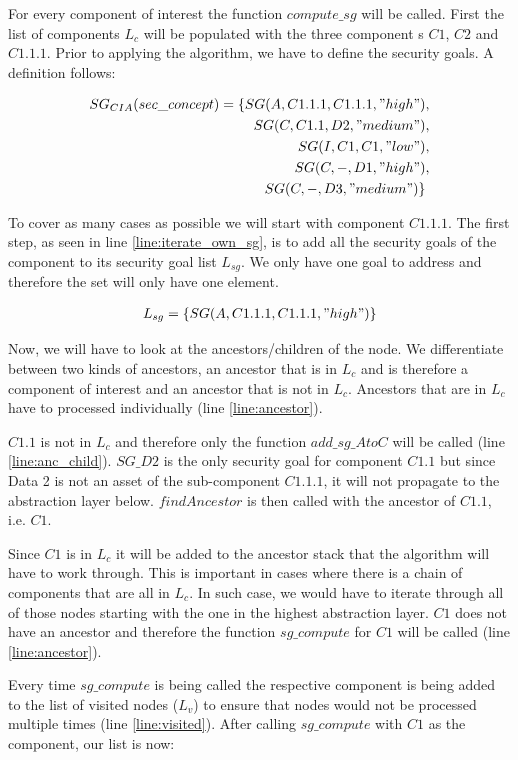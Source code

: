 For every component of interest the function $compute\_sg$ will be called. First the list of components $L_c$ will be populated with the three component s $C1$, $C2$ and $C1.1.1$. Prior to applying the algorithm, we have to define the security goals. A definition follows:

\begin{align*}
SG_{CIA}(sec\_concept) = \{SG(A,C1.1.1,C1.1.1,"high") &, \\ SG(C,C1.1,D2,"medium")&, \\
SG(I,C1,C1,"low")&, \\
SG(C,-,D1,"high")&, \\
SG(C,-,D3,"medium")\} 
\end{align*}

To cover as many cases as possible we will start with component $C1.1.1$. The first step, as seen in line \ref{line:iterate_own_sg}, is to add all the security goals of the component to its security goal list $L_{sg}$. We only have one goal to address and therefore the set will only have one element.

\begin{align*}
L_{sg} = \{SG(A,C1.1.1,C1.1.1,"high")\}
\end{align*}

Now, we will have to look at the ancestors/children of the node. We differentiate between two kinds of ancestors, an ancestor that is in $L_c$ and is therefore a component of interest and an ancestor that is not in $L_c$. Ancestors that are in $L_c$ have to processed individually (line \ref{line:ancestor}).

$C1.1$ is not in $L_c$ and therefore only the function $add\_sg\_AtoC$ will be called (line \ref{line:anc_child}). $SG\_D2$ is the only security goal for component $C1.1$ but since Data 2 is not an asset of the sub-component $C1.1.1$, it will not propagate to the abstraction layer below. $findAncestor$ is then called with the ancestor of $C1.1$, i.e. $C1$.

Since $C1$ is in $L_c$ it will be added to the ancestor stack that the algorithm will have to work through. This is important in cases where there is a chain of components that are all in $L_c$. In such case, we would have to iterate through all of those nodes starting with the one in the highest abstraction layer. $C1$ does not have an ancestor and therefore the function $sg\_compute$ for $C1$ will be called (line \ref{line:ancestor}).

Every time $sg\_compute$ is being called the respective component is being added to the list of visited nodes ($L_v$) to ensure that nodes would not be processed multiple times (line \ref{line:visited}). After calling $sg\_compute$ with $C1$ as the component, our list is now:

